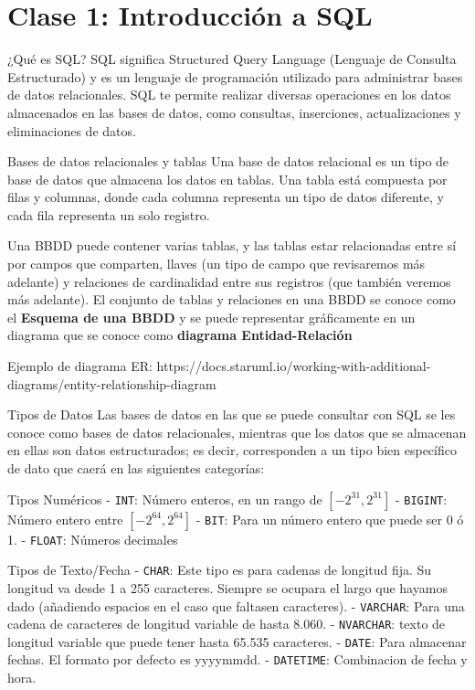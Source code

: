 \hypertarget{clase-1-introducciuxf3n-a-sql}{%
\section{Clase 1: Introducción a
SQL}\label{clase-1-introducciuxf3n-a-sql}}

\begin{frame}{¿Qué es SQL?}
\protect\hypertarget{quuxe9-es-sql}{}
SQL significa Structured Query Language (Lenguaje de Consulta
Estructurado) y es un lenguaje de programación utilizado para
administrar bases de datos relacionales. SQL te permite realizar
diversas operaciones en los datos almacenados en las bases de datos,
como consultas, inserciones, actualizaciones y eliminaciones de datos.
\end{frame}

\begin{frame}{Bases de datos relacionales y tablas}
\protect\hypertarget{bases-de-datos-relacionales-y-tablas}{}
Una base de datos relacional es un tipo de base de datos que almacena
los datos en tablas. Una tabla está compuesta por filas y columnas,
donde cada columna representa un tipo de datos diferente, y cada fila
representa un solo registro.

Una BBDD puede contener varias tablas, y las tablas estar relacionadas
entre sí por campos que comparten, llaves (un tipo de campo que
revisaremos más adelante) y relaciones de cardinalidad entre sus
registros (que también veremos más adelante). El conjunto de tablas y
relaciones en una BBDD se conoce como el \textbf{Esquema de una BBDD} y
se puede representar gráficamente en un diagrama que se conoce como
\textbf{diagrama Entidad-Relación}

Ejemplo de diagrama ER:
https://docs.staruml.io/working-with-additional-diagrams/entity-relationship-diagram
\end{frame}

\begin{frame}[fragile]{Tipos de Datos}
\protect\hypertarget{tipos-de-datos}{}
Las bases de datos en las que se puede consultar con SQL se les conoce
como bases de datos relacionales, mientras que los datos que se
almacenan en ellas son datos estructurados; es decir, corresponden a un
tipo bien específico de dato que caerá en las siguientes categorías:

Tipos Numéricos - \texttt{INT}: Número enteros, en un rango de
\([-2^{31},2^{31}]\) - \texttt{BIGINT}: Número entero entre
\([-2^{64},2^{64}]\) - \texttt{BIT}: Para un número entero que puede ser
0 ó 1. - \texttt{FLOAT}: Números decimales

Tipos de Texto/Fecha - \texttt{CHAR}: Este tipo es para cadenas de
longitud fija. Su longitud va desde 1 a 255 caracteres. Siempre se
ocupara el largo que hayamos dado (añadiendo espacios en el caso que
faltasen caracteres). - \texttt{VARCHAR}: Para una cadena de caracteres
de longitud variable de hasta 8.060. - \texttt{NVARCHAR}: texto de
longitud variable que puede tener hasta 65.535 caracteres. -
\texttt{DATE}: Para almacenar fechas. El formato por defecto es
yyyymmdd. - \texttt{DATETIME}: Combinacion de fecha y hora.
\end{frame}

